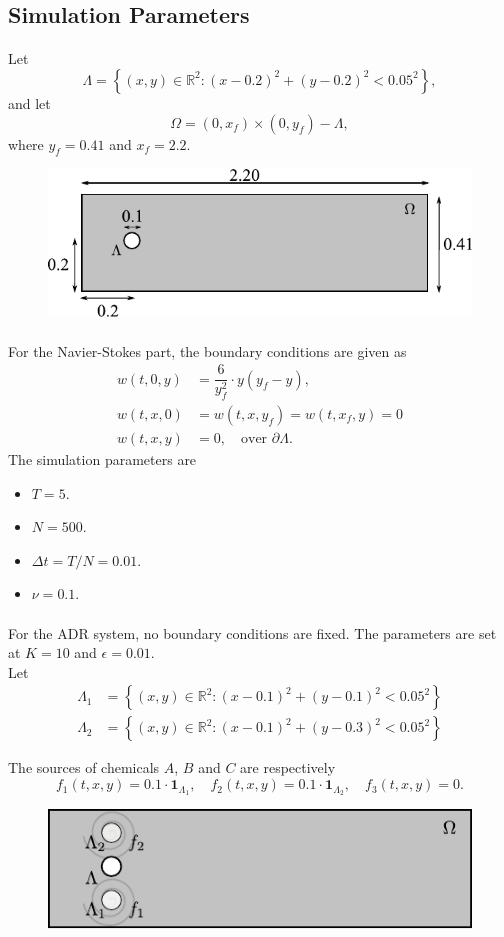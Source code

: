 \documentclass{beamer}
\theoremstyle{definition}
\theoremstyle{remark}
\theoremstyle{example}
\newif\ifinsection
\newif\ifinsubsection
\let\oldsubsection\subsection
\renewcommand{\subsection}{
  \global\insubsectiontrue
  \oldsubsection}
\newcommand {\aframe}[1] {
  \begin{frame}
    \ifinsection\frametitle{\secname}\fi
    \ifinsubsection\framesubtitle{\subsecname}\fi
  #1
  \end{frame}
}
\begin{document}
\subsection{Simulation Parameters}
\aframe{
  Let \[\Lambda=\left\{(x,y)\in\mathbb{R}^2:(x-0.2)^2 + (y-0.2)^2 < 0.05^2\right\},\]
  and let \[\Omega=(0,x_f) \times(0,y_f) - \Lambda,\] where $y_f=0.41$ and
  $x_f=2.2$. \vspace{0.5cm}
  \begin{figure}
    \centering
    \includegraphics[scale=1]{figs/region.pdf}
 \end{figure}
}

\aframe{For the Navier-Stokes part, the boundary conditions are given as
  \begin{align*}
    w(t, 0, y)& = \dfrac{6}{y_f^2}\cdot y(y_f-y),\\
    w(t, x, 0)& = w(t, x, y_f) = w(t, x_f, y) = 0\\
    w(t, x, y)& = 0,\quad \text{over }\partial\Lambda.
  \end{align*}
  The simulation parameters are
  \begin{itemize}
    \item $T=5$.
    \item $N=500$.
    \item $\Delta t=T/N=0.01$.
    \item $\nu=0.1$.
  \end{itemize}
}

\aframe{
  For the ADR system, no boundary conditions are fixed. The parameters are set
  at $K=10$ and $\epsilon=0.01$.\\\vspace{0.5cm}\pause
  Let
  \begin{align*}
    \Lambda_1&=\left\{(x,y)\in\mathbb{R}^2:(x-0.1)^2+(y-0.1)^2<0.05^2\right\}\\
    \Lambda_2&=\left\{(x,y)\in\mathbb{R}^2:(x-0.1)^2+(y-0.3)^2<0.05^2\right\}
  \end{align*}

  The sources of chemicals $A$, $B$ and $C$ are respectively
  \[
  f_1(t,x,y)=0.1\cdot\pmb{1}_{\Lambda_1},\quad f_2(t,x,y)=0.1\cdot\pmb{1}_{\Lambda_2},
    \quad f_3(t,x,y)=0.
  \]
  \begin{figure}
    \centering
    \includegraphics[scale=1]{figs/region2.pdf}
  \end{figure}
}
\end{document}
